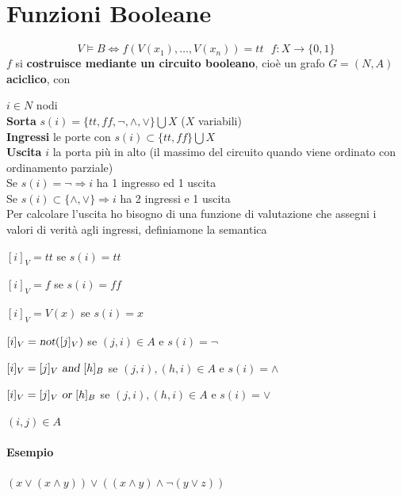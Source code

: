 \documentclass[10pt]{book}
\begin{document}
\section{Funzioni Booleane}
$$V \vDash B \Leftrightarrow f(V(x_1), \ldots, V(x_n)) = tt\:\:\: f: X \rightarrow \{0, 1\}$$
$f$ si \textbf{costruisce mediante un circuito booleano}, cioè un grafo $G = (N, A)$ \textbf{aciclico}, con 
\begin{list}{}{}
	\item $i \in N$ nodi\\
	\textbf{Sorta} $s(i) = \{tt, ff, \neg, \wedge, \vee\} \bigcup X$ ($X$ variabili)\\
	\textbf{Ingressi} le porte con $s(i) \subset \{tt, ff\} \bigcup X$\\
	\textbf{Uscita} $i$ la porta più in alto (il massimo del circuito quando viene ordinato con ordinamento parziale)\\
	Se $s(i) = \neg \Rightarrow i$ ha 1 ingresso ed 1 uscita\\
	Se $s(i) \subset \{\wedge, \vee\} \Rightarrow i$ ha 2 ingressi e 1 uscita\\
	Per calcolare l'uscita ho bisogno di una funzione di valutazione che assegni i valori di verità agli ingressi, definiamone la semantica
	\begin{multicols}{2} \begin{list}{}{}
		\item $[i]_V = tt$ se $s(i) = tt$
		\item $[i]_V = f$ se $s(i) = ff$
		\item $[i]_V = V(x)$ se $s(i) = x$
		\item $[i]_V = \textsl{not}([j]_V)$ se $(j, i) \in A$ e $s(i) = \neg$
		\item $[i]_V = [j]_V \textsl{ and } [h]_B$ se $(j, i), (h, i) \in A$ e $s(i) = \wedge$
		\item $[i]_V = [j]_V \textsl{ or } [h]_B$ se $(j, i), (h, i) \in A$ e $s(i) = \vee$
	\end{list} \end{multicols}
	\item $(i, j) \in A$
\end{list}
\paragraph{Esempio} $(x \vee (x \wedge y)) \vee ((x \wedge y) \wedge \neg(y \vee z))$
\end{document}
